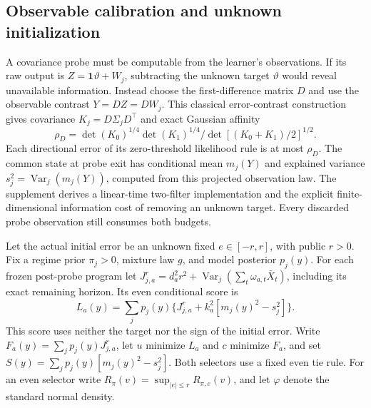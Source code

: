 \subsection{Observable calibration and unknown initialization}
A covariance probe must be computable from the learner's observations.
If its raw output is $Z=\boldsymbol1\vartheta+W_j$, subtracting the unknown target $\vartheta$ would reveal unavailable information.
Instead choose the first-difference matrix $D$ and use the observable contrast $Y=DZ=DW_j$.
This classical error-contrast construction~\cite{harville1974contrasts} gives covariance $K_j=D\Sigma_jD^\top$ and exact Gaussian affinity
\[
\rho_D=\det(K_0)^{1/4}\det(K_1)^{1/4}/\det[(K_0+K_1)/2]^{1/2}.
\]
Each directional error of its zero-threshold likelihood rule is at most $\rho_D$.
The common state at probe exit has conditional mean $m_j(Y)$ and explained variance $s_j^2=\operatorname{Var}_j(m_j(Y))$, computed from this projected observation law.
The supplement derives a linear-time two-filter implementation and the explicit finite-dimensional information cost of removing an unknown target.
Every discarded probe observation still consumes both budgets.

Let the actual initial error be an unknown fixed $e\in[-r,r]$, with public $r>0$.
Fix a regime prior $\pi_j>0$, mixture law $g$, and model posterior $p_j(y)$.
For each frozen post-probe program let $J_{j,a}^{r}=d_a^2r^2+\operatorname{Var}_j(\sum_t\omega_{a,t}\bar X_t)$, including its exact remaining horizon.
Its even conditional score is
\begin{equation}
L_a(y)=\sum_jp_j(y)\{J_{j,a}^{r}+k_a^2[m_j(y)^2-s_j^2]\}.
\label{eq:conditional-even-score}
\end{equation}
This score uses neither the target nor the sign of the initial error.
Write $F_a(y)=\sum_jp_j(y)J_{j,a}^{r}$, let $u$ minimize $L_a$ and $c$ minimize $F_a$, and set $S(y)=\sum_jp_j(y)[m_j(y)^2-s_j^2]$.
Both selectors use a fixed even tie rule.
For an even selector write $R_\pi(v)=\sup_{|e|\le r}R_{\pi,e}(v)$, and let $\varphi$ denote the standard normal density.

